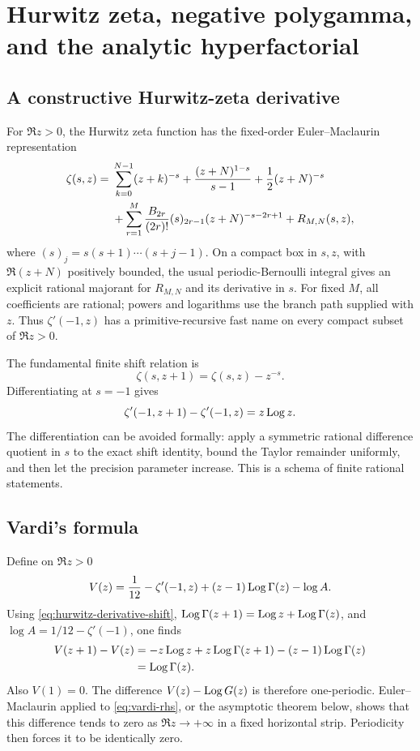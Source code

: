 \section{Hurwitz zeta, negative polygamma, and the analytic hyperfactorial}\label{sec:hurwitz}

\subsection{A constructive Hurwitz-zeta derivative}

For \(\Re z>0\), the Hurwitz zeta function has the fixed-order
Euler--Maclaurin representation
\begin{align}
 \zeta(s,z)={}&\sum_{k=0}^{N-1}(z+k)^{-s}
 +\frac{(z+N)^{1-s}}{s-1}+\frac12(z+N)^{-s}\notag\\
 &+\sum_{r=1}^{M}
 \frac{B_{2r}}{(2r)!}(s)_{2r-1}(z+N)^{-s-2r+1}
 +R_{M,N}(s,z),
 \label{eq:hurwitz-EM}
\end{align}
where \((s)_j=s(s+1)\cdots(s+j-1)\).  On a compact box in \(s,z\), with
\(\Re(z+N)\) positively bounded, the usual periodic-Bernoulli integral gives
an explicit rational majorant for \(R_{M,N}\) and its derivative in \(s\).
For fixed \(M\), all coefficients are rational; powers and logarithms use the
branch path supplied with \(z\).  Thus \(\zeta'(-1,z)\) has a
primitive-recursive fast name on every compact subset of \(\Re z>0\).

The fundamental finite shift relation is
\begin{equation}\label{eq:hurwitz-shift}
 \zeta(s,z+1)=\zeta(s,z)-z^{-s}.
\end{equation}
Differentiating at \(s=-1\) gives
\begin{equation}\label{eq:hurwitz-derivative-shift}
 \zeta'(-1,z+1)-\zeta'(-1,z)=z\operatorname{Log} z.
\end{equation}
The differentiation can be avoided formally: apply a symmetric rational
difference quotient in \(s\) to the exact shift identity, bound the Taylor
remainder uniformly, and then let the precision parameter increase.  This is a
schema of finite rational statements.

\subsection{Vardi's formula}

Define on \(\Re z>0\)
\begin{equation}\label{eq:vardi-rhs}
 V(z)=\frac1{12}-\zeta'(-1,z)+(z-1)\operatorname{Log}\Gamma(z)-\log A.
\end{equation}
Using \cref{eq:hurwitz-derivative-shift},
\(\operatorname{Log}\Gamma(z+1)=\operatorname{Log} z+\operatorname{Log}\Gamma(z)\), and
\(\log A=1/12-\zeta'(-1)\), one finds
\begin{align*}
 V(z+1)-V(z)
 &=-z\operatorname{Log} z+z\operatorname{Log}\Gamma(z+1)-(z-1)\operatorname{Log}\Gamma(z)\\
 &=\operatorname{Log}\Gamma(z).
\end{align*}
Also \(V(1)=0\).  The difference
\(V(z)-\operatorname{Log} G(z)\) is therefore one-periodic.  Euler--Maclaurin applied to
\cref{eq:vardi-rhs}, or the asymptotic theorem below, shows that this difference
tends to zero as \(\Re z\to+\infty\) in a fixed horizontal strip.  Periodicity
then forces it to be identically zero.

